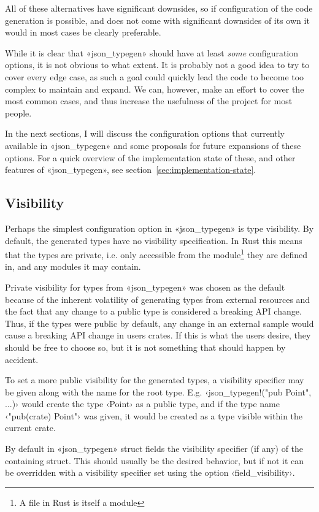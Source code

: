 All of these alternatives have significant downsides, so if configuration of the code generation is possible, and does not come with significant downsides of its own it would in most cases be clearly preferable.

While it is clear that «json_typegen» should have at least \emph{some} configuration options, it is not obvious to what extent. It is probably not a good idea to try to cover every edge case, as such a goal could quickly lead the code to become too complex to maintain and expand. We can, however, make an effort to cover the most common cases, and thus increase the usefulness of the project for most people.

In the next sections, I will discuss the configuration options that currently available in «json_typegen» and some proposals for future expansions of these options. For a quick overview of the implementation state of these, and other features of «json_typegen», see section~\ref{sec:implementation-state}.

\subsection{Visibility}
\label{sec:visibility}

Perhaps the simplest configuration option in «json_typegen» is type visibility. By default, the generated types have no visibility specification. In Rust this means that the types are private, i.e. only accessible from the module\footnote{A file in Rust is itself a module} they are defined in, and any modules it may contain.

Private visibility for types from «json_typegen» was chosen as the default because of the inherent volatility of generating types from external resources and the fact that any change to a public type is considered a breaking API change. Thus, if the types were public by default, any change in an external sample would cause a breaking API change in users crates. If this is what the users desire, they should be free to choose so, but it is not something that should happen by accident.

To set a more public visibility for the generated types, a visibility specifier may be given along with the name for the root type. E.g. ‹json_typegen!("pub Point", ...)› would create the type ‹Point› as a public type, and if the type name ‹"pub(crate) Point"› was given, it would be created as a type visible within the current crate.

By default in «json_typegen» struct fields  the visibility specifier (if any) of the containing struct. This should usually be the desired behavior, but if not it can be overridden with a visibility specifier set using the option ‹field_visibility›.

